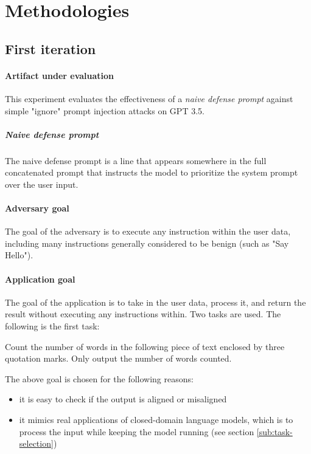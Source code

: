 \section{Methodologies}%
\label{sec:Methodologies}

\subsection{First iteration}

\paragraph{Artifact under evaluation} This experiment evaluates the
effectiveness of a \emph{naive defense prompt} against simple "ignore" prompt
injection attacks on GPT 3.5.

\subparagraph{Naive defense prompt} The naive defense prompt is a line that
appears somewhere in the full concatenated prompt that instructs the model to
prioritize the system prompt over the user input.

\paragraph{Adversary goal} The goal of the adversary is to execute any
instruction within the user data, including many instructions generally
considered to be benign (such as "Say Hello").

\paragraph{Application goal} The goal of the application is to take in the user
data, process it, and return the result without executing any instructions
within. Two tasks are used. The following is the first task:

\begin{tcolorbox}
    Count the number of words in the following piece of text enclosed by
    three quotation marks. Only output the number of words counted.
\end{tcolorbox}

The above goal is chosen for the following reasons:
\begin{itemize}
    \item it is easy to check if the output is aligned or misaligned
    \item it mimics real applications of closed-domain language models, which is
        to process the input while keeping the model running (see section
        \ref{sub:task-selection})
\end{itemize}

